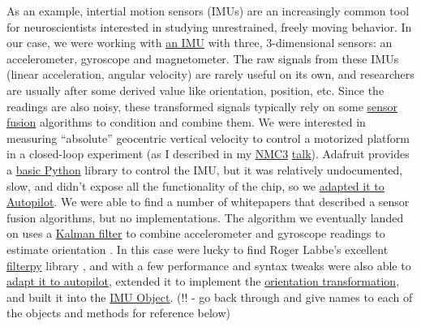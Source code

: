 \documentclass[10pt]{article}
\begin{document}
\begin{multicols}{2}
As an example, intertial motion sensors (IMUs) are an increasingly
common tool for neuroscientists interested in studying unrestrained,
freely moving behavior. In our case, we were working with
\href{https://web.archive.org/web/20210127212527/https://www.sparkfun.com/products/13944}{an
IMU} with three, 3-dimensional sensors: an accelerometer, gyroscope and
magnetometer. The raw signals from these IMUs (linear acceleration,
angular velocity) are rarely useful on its own, and researchers are
usually after some derived value like orientation, position, etc. Since
the readings are also noisy, these transformed signals typically rely on
some \href{https://en.wikipedia.org/wiki/Sensor_fusion}{sensor fusion}
algorithms to condition and combine them. We were interested in
measuring ``absolute'' geocentric vertical velocity to control a
motorized platform in a closed-loop experiment (as I described in my
\href{https://neuromatch.io/abstract/?submission_id=recI5D0QaJ857Y4JI}{NMC3}
\href{https://youtu.be/l2K0l4ec0Xw}{talk}). Adafruit provides a
\href{https://github.com/adafruit/Adafruit_CircuitPython_LSM9DS1/blob/master/adafruit_lsm9ds1.py}{basic
Python} library to control the IMU, but it was relatively undocumented,
slow, and didn't expose all the functionality of the chip, so we
\href{https://web.archive.org/web/20210421223148/https://docs.auto-pi-lot.com/en/parallax/autopilot.hardware.i2c.html\#autopilot.hardware.i2c.I2C_9DOF}{adapted
it to Autopilot}. We were able to find a number of whitepapers that
described a sensor fusion algorithms, but no implementations. The
algorithm we eventually landed on uses a
\href{https://en.wikipedia.org/wiki/Kalman_filter}{Kalman filter} to
combine accelerometer and gyroscope readings to estimate orientation
\cite{abyarjooImplementingSensorFusion2015a} . In this case were
lucky to find Roger Labbe's excellent
\href{https://github.com/rlabbe/filterpy}{filterpy} library \cite{labbeKalmanBayesianFilters2020, labbeRlabbeFilterpy2021} , and with a
few performance and syntax tweaks were also able to
\href{https://web.archive.org/web/20210421223300/https://docs.auto-pi-lot.com/en/parallax/autopilot.transform.timeseries.html\#autopilot.transform.timeseries.Kalman}{adapt
it to autopilot}, extended it to implement the
\href{https://web.archive.org/web/20210421212747/https://docs.auto-pi-lot.com/en/parallax/autopilot.transform.geometry.html}{orientation
transformation}, and built it into the
\href{https://github.com/wehr-lab/autopilot/blob/6843c0e7b6e2bfb4c35e2f7c41972336765feabd/autopilot/hardware/i2c.py\#L469-L501}{IMU
Object}. (!! - go back through and give names to each of the objects and
methods for reference below)


\end{multicols}
\end{document}
